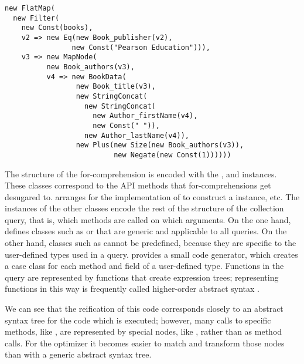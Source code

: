 \begin{lstlisting}
new FlatMap(
  new Filter(
    new Const(books),
    v2 => new Eq(new Book_publisher(v2),
                new Const("Pearson Education"))),
    v3 => new MapNode(
          new Book_authors(v3),
          v4 => new BookData(
                 new Book_title(v3),
                 new StringConcat(
                   new StringConcat(
                     new Author_firstName(v4),
                     new Const(" ")),
                   new Author_lastName(v4)),
                 new Plus(new Size(new Book_authors(v3)),
                          new Negate(new Const(1))))))
\end{lstlisting}

The structure of the for-comprehension is encoded with the ,  and  instances. These classes correspond to the API methods that for-comprehensions get desugared to. {\LoS} arranges for the implementation of  to construct a  instance, etc.
The instances of the other classes encode the rest of the structure of the collection query, that is, which methods are called on which arguments. On the one hand, {\LoS} defines classes such as  or  that are generic and applicable to all queries. On the other hand, classes such as  cannot be predefined, because they are specific to the user-defined types used in a query. {\LoS} provides a small code generator, which creates a case class for
each method and field of a user-defined type. Functions in the query are represented by functions that
create expression trees; representing functions in this way is frequently called higher-order
abstract syntax \citep{Pfenning88hoas}.

We can see that the reification of this code corresponds closely to an abstract
syntax tree for the code which is executed; however, many calls to specific
methods, like , are represented by special nodes, like , rather
than as method calls.
For the optimizer it becomes easier to match and transform those
nodes than with a generic abstract syntax tree.

